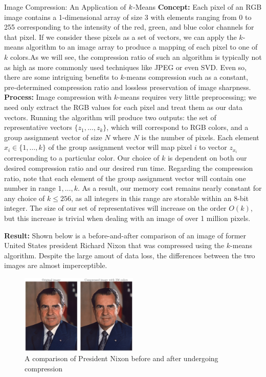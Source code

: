 \documentclass{article}
\begin{document}
\begin{section}{Image Compression: An Application of $\boldmath{k}$-Means}
\textbf{Concept:} Each pixel of an RGB image contains a 1-dimensional array of size 3 with elements ranging from 0 to 255 corresponding to the intensity of the red, green, and blue color channels for that pixel. If we consider these pixels as a set of vectors, we can apply the $k$-means algorithm to an image array to produce a mapping of each pixel to one of $k$ colors.As we will see, the compression ratio of such an algorithm is typically not as high as more commonly used techniques like JPEG or even SVD. Even so, there are some intriguing benefits to $k$-means compression such as a constant, pre-determined compression ratio and lossless preservation of image sharpness.\\

\textbf{Process:} Image compression with $k$-means requires very little preprocessing; we need only extract the RGB values for each pixel and treat them as our data vectors. Running the algorithm will produce two outputs: the set of representative vectors $\{z_1,\ldots,z_k\}$, which will correspond to RGB colors, and a group assignment vector of size $N$ where $N$ is the number of pixels. Each element $x_i \in \{1,\ldots,k\}$ of the group assignment vector will map pixel $i$ to vector $z_{x_i}$ corresponding to a particular color. Our choice of $k$ is dependent on both our desired compression ratio and our desired run time.  Regarding the compression ratio, note that each element of the group assignment vector will contain one number in range $1,\ldots,k$. As a result, our memory cost remains nearly constant for any choice of $k\le 256$, as all integers in this range are storable within an 8-bit integer. The size of our set of representatives will increase on the order $O(k)$, but this increase is trivial when dealing with an image of over 1 million pixels.

\textbf{Result:} Shown below is a before-and-after comparison of an image of former United States president Richard Nixon that was compressed using the $k$-means algorithm. Despite the large amout of data loss, the differences between the two images are almost imperceptible.

\begin{figure}[h!]
 \centering
  \includegraphics[width=0.5\textwidth]{nixon_compressed.png}
 \caption{A comparison of President Nixon before and after undergoing compression \cite{nixon}}
 \end{figure}


\end{section}
\end{document}
